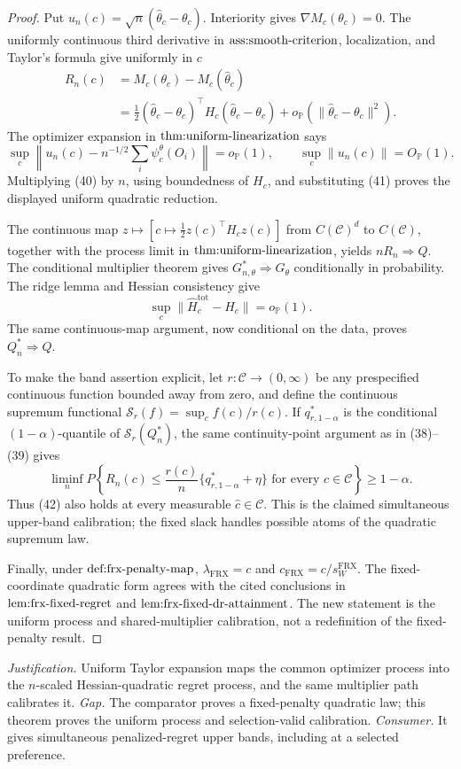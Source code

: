 \documentclass{article}
\begin{document}
\begin{proof}
Put \(u_n(c)=\sqrt n(\widehat\theta_c-\theta_c)\). Interiority gives \(\nabla M_c(\theta_c)=0\). The uniformly continuous third derivative in \(\textnormal{ass:smooth-criterion}\), localization, and Taylor's formula give uniformly in \(c\)
\[
\begin{aligned}
 R_n(c)
 &=M_c(\theta_c)-M_c(\widehat\theta_c)\\
 &=\tfrac12(\widehat\theta_c-\theta_c)^\top H_c(\widehat\theta_c-\theta_c)
   +o_{\mathbb P}(\|\widehat\theta_c-\theta_c\|^2).
\end{aligned}
\tag{40}
\]
The optimizer expansion in \(\textnormal{thm:uniform-linearization}\) says
\[
 \sup_c\left\|u_n(c)-n^{-1/2}\sum_i\psi_c^\theta(O_i)\right\|=o_{\mathbb P}(1),
 \qquad \sup_c\|u_n(c)\|=O_{\mathbb P}(1).
 \tag{41}
\]
Multiplying (40) by \(n\), using boundedness of \(H_c\), and substituting (41) proves the displayed uniform quadratic reduction.

The continuous map \(z\mapsto[c\mapsto\tfrac12z(c)^\top H_cz(c)]\) from \(C(\mathcal C)^d\) to \(C(\mathcal C)\), together with the process limit in \(\textnormal{thm:uniform-linearization}\), yields \(nR_n\Rightarrow Q\). The conditional multiplier theorem gives \(G_{n,\theta}^*\Rightarrow G_\theta\) conditionally in probability. The ridge lemma and Hessian consistency give
\[
 \sup_c\|\widehat H_c^{\mathrm{tot}}-H_c\|=o_{\mathbb P}(1).
\]
The same continuous-map argument, now conditional on the data, proves \(Q_n^*\Rightarrow Q\).

To make the band assertion explicit, let \(r:\mathcal C\to(0,\infty)\) be any prespecified continuous function bounded away from zero, and define the continuous supremum functional \(\mathcal S_r(f)=\sup_cf(c)/r(c)\). If \(q^*_{r,1-\alpha}\) is the conditional \((1-\alpha)\)-quantile of \(\mathcal S_r(Q_n^*)\), the same continuity-point argument as in (38)--(39) gives
\[
 \liminf_nP\left\{R_n(c)\leq \frac{r(c)}n\{q^*_{r,1-\alpha}+\eta\}
                  \text{ for every }c\in\mathcal C\right\}\geq1-\alpha.
 \tag{42}
\]
Thus (42) also holds at every measurable \(\widehat c\in\mathcal C\). This is the claimed simultaneous upper-band calibration; the fixed slack handles possible atoms of the quadratic supremum law.

Finally, under \(\textnormal{def:frx-penalty-map}\), \(\lambda_{\mathrm{FRX}}=c\) and \(c_{\mathrm{FRX}}=c/s_W^{\mathrm{FRX}}\). The fixed-coordinate quadratic form agrees with the cited conclusions in \(\textnormal{lem:frx-fixed-regret}\) and \(\textnormal{lem:frx-fixed-dr-attainment}\). The new statement is the uniform process and shared-multiplier calibration, not a redefinition of the fixed-penalty result.
\end{proof}
\par\smallskip\noindent \textit{Justification.} Uniform Taylor expansion maps the common optimizer process into the \(n\)-scaled Hessian-quadratic regret process, and the same multiplier path calibrates it. \textit{Gap.} The comparator proves a fixed-penalty quadratic law; this theorem proves the uniform process and selection-valid calibration. \textit{Consumer.} It gives simultaneous penalized-regret upper bands, including at a selected preference.
\end{document}
